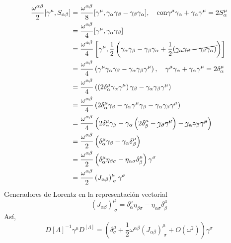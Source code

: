 \documentclass[../main.tex]{subfiles}
\begin{document}
\begin{align*}
  \frac{\omega^{\alpha \beta}}{2} [\gamma^\mu , S_{\alpha \beta}] & = \frac{\omega^{\alpha \beta}}{8} [\gamma^\mu , \gamma_\alpha \gamma_\beta - \gamma_\beta \gamma_\alpha], \quad \text{con} \gamma^\mu \gamma_\alpha + \gamma_\alpha \gamma^\mu = 2S^\mu_{\alpha} \\
  & = \frac{\omega^{\alpha \beta}}{4} [\gamma^\mu , \gamma_\alpha \gamma_\beta] \\
  & = \frac{\omega^{\alpha \beta}}{4} \left[ \gamma^\mu , \frac{1}{2}\left( \gamma_\alpha \gamma_\beta - \gamma_\beta \gamma_\alpha + \frac{1}{2} \cancel{\left(  \gamma_\alpha\gamma_\beta - \gamma_\beta \gamma_\alpha \right) } \right) \right] \\
  & = \frac{\omega^{\alpha \beta}}{4} \left( \gamma^\mu  \gamma_\alpha \gamma_\beta - \gamma_\alpha \gamma_\beta \gamma^\mu \right), \quad \gamma^\mu \gamma_\alpha  + \gamma_\alpha \gamma^\mu = 2 \delta^\mu_\alpha \\ 
  & = \frac{\omega^{\alpha \beta}}{4} \left( \left( 2\delta^\mu_\alpha \gamma_\alpha \gamma^\mu \right) \gamma_\beta - \gamma_\alpha \gamma_\beta \gamma^\mu \right) \\
  & = \frac{\omega^{\alpha \beta}}{4} \left( 2\delta^\mu_\alpha \gamma_\beta - \gamma_\alpha \gamma^\mu \gamma_\beta - \gamma_\alpha \gamma_\beta \gamma^\mu \right) \\
  & = \frac{\omega^{\alpha \beta}}{4} \left( 2\delta^\mu_\alpha \gamma_\beta - \gamma_\alpha \left( 2\delta^\mu_\beta - \cancel{\gamma_\beta \gamma^\mu} \right) - \cancel{\gamma_\alpha \gamma_\beta \gamma^\mu} \right) \\
  & = \frac{\omega^{\alpha\beta}}{2} \left( \delta^\mu_\alpha \gamma_\beta - \gamma_\alpha \delta^\mu_\beta\right) \\
  & = \frac{\omega^{\alpha \beta}}{2} \left( \delta^\mu_\alpha \eta_{\beta \sigma} - \eta_{\alpha\sigma} \delta^\mu_{\beta} \right)\gamma^\sigma \\
  & = \frac{\omega^{\alpha\beta}}{2} \left( J_{\alpha \beta} \right)^\mu_{\; \sigma} \gamma^\sigma
\end{align*}
Generadores de Lorentz en la representación vectorial
\begin{equation*}
  \left( J_{\alpha \beta} \right)^\mu_{\; \sigma} = \delta^\mu_\alpha \eta_{\beta \sigma} - \eta_{\alpha \sigma} \delta^\mu_\beta 
\end{equation*}
Así,
\begin{equation*}
  D[\Lambda]^{-1}\gamma^\mu D^[\Lambda] = \left( \delta^\mu_{\sigma} + \frac{1}{2}\omega^{\alpha\beta} \left( J_{\alpha \beta} \right)^\mu_{\; \sigma} + O(\omega^2) \right)\gamma^\sigma
\end{equation*}
\end{document}

